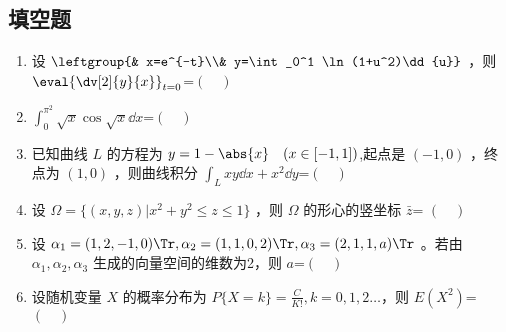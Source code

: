 \subsection{填空题}
\begin{enumerate}
\item 设 $\leftgroup{& x=e^{-t}\\& y=\int_0^1 \ln(1+u^2)\dd{u}}$   ，则 $\displaystyle \eval{\dv[2]{y}{x}}_{t=0}$=$(\quad )$
\item $\displaystyle \int_0^{\pi^2}\sqrt{x}\cos \sqrt{x}\dd{x}$=$(\quad )$
\item  已知曲线 $L$ 的方程为 $y=1-\abs{x} \quad (x \in [-1,1])$,起点是 $(-1,0)$ ，终点为 $(1,0)$ ，则曲线积分 $\displaystyle \int_L xy\dd{x}+x^2\dd{y}$=$(\quad )$
\item 设 $\Omega=\{(x,y,z)|x^2+y^2\le z \le1\}$ ，则 $\Omega$ 的形心的竖坐标 $\bar z$= $(\quad )$
\item 设 $\alpha_1=(1,2,-1,0)\Tr ,\alpha_2=(1,1,0,2)\Tr ,\alpha_3=(2,1,1,a)\Tr $  。若由 $\alpha_1,\alpha_2,\alpha_3$  生成的向量空间的维数为2，则  $a$=$(\quad )$
\item  设随机变量 $X$  的概率分布为 $P\{X=k\}=\frac{C}{K!},k=0,1,2\dots$，则 $E(X^2)$=$(\quad )$
\end{enumerate}
